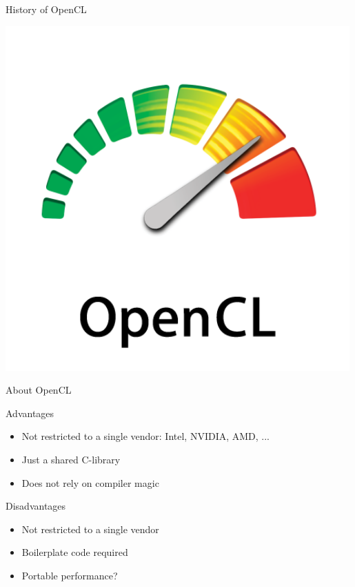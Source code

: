\begin{frame}{History of OpenCL}
\begin{minipage}{0.7\textwidth}
\end{minipage} \hfill
\begin{minipage}{0.25\textwidth}
 \includegraphics[width=0.99\textwidth]{figures/opencl.jpg}
 
 \vspace*{5cm}
\end{minipage}


\end{frame}





\begin{frame}{About OpenCL}

\begin{block}{Advantages}
  \begin{itemize}
   \item Not restricted to a single vendor: Intel, NVIDIA, AMD, ...
   \item Just a shared C-library
   \item Does not rely on compiler magic
  \end{itemize}
\end{block}

\pause
\begin{block}{Disadvantages}
  \begin{itemize}
   \item Not restricted to a single vendor
   \item Boilerplate code required
   \item Portable performance?
  \end{itemize}
\end{block}

\end{frame}


